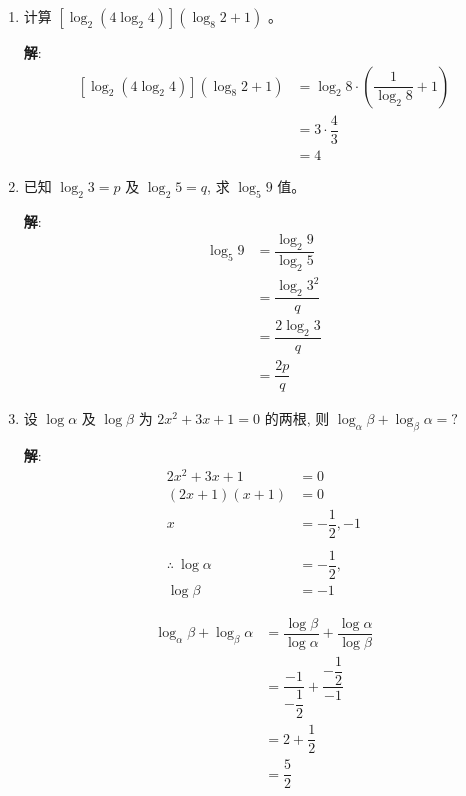 \documentclass{report}
\newcommand{\sol}{\vspace{0.2cm}\textbf{解}:}
\begin{document}
\begin{multicols*}{2}
\begin{enumerate}[leftmargin=*]
        \item 计算 $\left[\log _2\left(4 \log _2 4\right)\right]\left(\log _8 2+1\right)$ 。

              \sol{}
              \begin{align*}
                  \left[\log _2\left(4 \log _2 4\right)\right]\left(\log _8 2+1\right) & = \log_2 8 \cdot \left(\dfrac{1}{\log_2 8} + 1\right) \\
                                                                                       & = 3 \cdot \dfrac{4}{3}                                \\
                                                                                       & = 4
              \end{align*}

        \item 已知 $\log _2 3=p$ 及 $\log _2 5=q$, 求 $\log _5 9$ 值。

              \sol{}
              \begin{align*}
                  \log_5 9 & = \dfrac{\log_2 9}{\log_2 5} \\
                           & = \dfrac{\log_2 3^2}{q}      \\
                           & = \dfrac{2 \log_2 3}{q}      \\
                           & = \dfrac{2p}{q}
              \end{align*}

              \setcounter{enumi}{6}

        \item 设 $\log \alpha$ 及 $\log \beta$ 为 $2 x^2+3 x+1=0$ 的两根, 则 $\log _\alpha \beta+\log _\beta \alpha=?$

              \sol{}
              \begin{align*}
                  2x^2 + 3x + 1           & = 0                 \\
                  (2x + 1)(x + 1)         & = 0                 \\
                  x                       & = -\dfrac{1}{2}, -1 \\
                  \\
                  \therefore\ \log \alpha & = -\dfrac{1}{2},    \\
                  \log \beta              & = -1
              \end{align*}

              \begin{align*}
                  \log_\alpha \beta + \log_\beta \alpha & = \dfrac{\log \beta}{\log \alpha} + \dfrac{\log \alpha}{\log \beta} \\
                                                        & = \dfrac{-1}{-\dfrac{1}{2}} + \dfrac{-\dfrac{1}{2}}{-1}             \\
                                                        & = 2 + \dfrac{1}{2}                                                  \\
                                                        & = \dfrac{5}{2}
              \end{align*}


\end{enumerate}
\end{multicols*}
\end{document}
